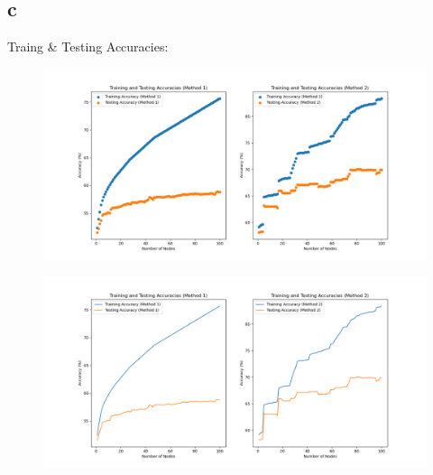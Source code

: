 \documentclass[10pt]{article}
\begin{document}
\begin{enumerate}
\part{c} Traing \& Testing Accuracies:
\begin{figure}[H]
	\center
	\includegraphics[width=\linewidth]{method_accuracies.png}
	\end{figure}
	
	\begin{figure}[H]
	\center
	\includegraphics[width=\linewidth]{plot.png}
	\end{figure}
\end{enumerate}


\newpage
\end{document}
